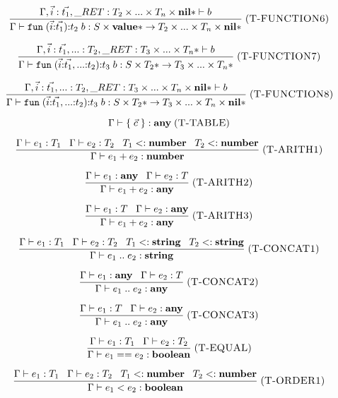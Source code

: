 \documentclass[12pt]{article}
\newcommand{\Top}{\mathbf{value}}
\newcommand{\Any}{\mathbf{any}}
\newcommand{\Nil}{\mathbf{nil}}
\newcommand{\Boolean}{\mathbf{boolean}}
\newcommand{\Number}{\mathbf{number}}
\newcommand{\String}{\mathbf{string}}
\newcommand{\kw}[1]{\mathbf{\texttt{#1}}}
\newcommand{\mylabel}[1]{\; (\textsc{#1})}
\newcommand{\subtype}{<:}
\newcommand{\env}{\Gamma}
\newcommand{\ret}{\string_RET}
\begin{document}
\[
\frac{\env, \vec{i}:\vec{t_{1}},
      \ret:T_{2} \times ... \times T_{n} \times \Nil{*} \vdash b}
     {\env \vdash \kw{fun} \; (\vec{i}{:}\vec{t_{1}}){:}t_{2} \; b :
      S \times \Top{*} \rightarrow T_{2} \times ... \times T_{n} \times \Nil{*}}
\mylabel{T-FUNCTION6}
\]

\[
\frac{\env, \vec{i}:\vec{t_{1}}, {...}:T_{2},
      \ret:T_{3} \times ... \times T_{n}* \vdash b}
     {\env \vdash \kw{fun} \; (\vec{i}{:}\vec{t_{1}},{...}{:}t_{2}){:}t_{3} \; b :
      S \times T_{2}* \rightarrow T_{3} \times ... \times T_{n}*}
\mylabel{T-FUNCTION7}
\]

\[
\frac{\env, \vec{i}:\vec{t_{1}}, {...}:T_{2},
      \ret:T_{3} \times ... \times T_{n} \times \Nil{*} \vdash b}
     {\env \vdash \kw{fun} \; (\vec{i}{:}\vec{t_{1}},{...}{:}t_{2}){:}t_{3} \; b :
      S \times T_{2}* \rightarrow T_{3} \times ... \times T_{n} \times \Nil{*}}
\mylabel{T-FUNCTION8}
\]

\[
\env \vdash \{ \; \vec{c} \; \} : \Any
\mylabel{T-TABLE}
\]

\[
\frac{\env \vdash e_{1}:T_{1} \;\;\;
      \env \vdash e_{2}:T_{2} \;\;\;
      T_{1} \subtype \Number \;\;\;
      T_{2} \subtype \Number}
     {\env \vdash e_{1} + e_{2} : \Number}
\mylabel{T-ARITH1}
\]

\[
\frac{\env \vdash e_{1}:\Any \;\;\;
      \env \vdash e_{2}:T}
     {\env \vdash e_{1} + e_{2} : \Any}
\mylabel{T-ARITH2}
\]

\[
\frac{\env \vdash e_{1}:T \;\;\;
      \env \vdash e_{2}:\Any}
     {\env \vdash e_{1} + e_{2} : \Any}
\mylabel{T-ARITH3}
\]

\[
\frac{\env \vdash e_{1}:T_{1} \;\;\;
      \env \vdash e_{2}:T_{2} \;\;\;
      T_{1} \subtype \String \;\;\;
      T_{2} \subtype \String}
     {\env \vdash e_{1} \; {..} \; e_{2} : \String}
\mylabel{T-CONCAT1}
\]

\[
\frac{\env \vdash e_{1}:\Any \;\;\;
      \env \vdash e_{2}:T}
     {\env \vdash e_{1} \; {..} \; e_{2} : \Any}
\mylabel{T-CONCAT2}
\]

\[
\frac{\env \vdash e_{1}:T \;\;\;
      \env \vdash e_{2}:\Any}
     {\env \vdash e_{1} \; {..} \; e_{2} : \Any}
\mylabel{T-CONCAT3}
\]

\[
\frac{\env \vdash e_{1}:T_{1} \;\;\;
      \env \vdash e_{2}:T_{2}}
     {\env \vdash e_{1} == e_{2} : \Boolean}
\mylabel{T-EQUAL}
\]

\[
\frac{\env \vdash e_{1}:T_{1} \;\;\;
      \env \vdash e_{2}:T_{2} \;\;\;
      T_{1} \subtype \Number \;\;\;
      T_{2} \subtype \Number}
     {\env \vdash e_{1} < e_{2} : \Boolean}
\mylabel{T-ORDER1}
\]
\end{document}
